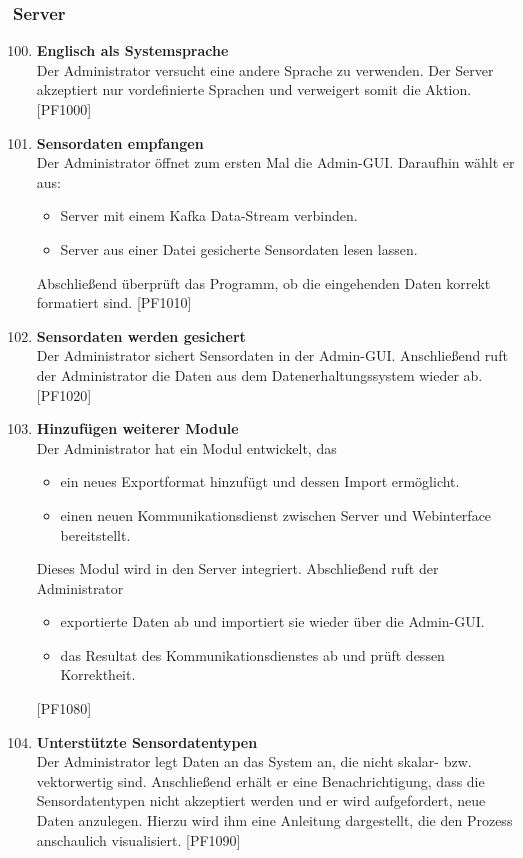 \subsubsection{Server}
\begin{enumerate}[label=\textbf{TK\arabic{enumi}0}]
	\setcounter{enumi}{99}
	
	\item \textbf{Englisch als Systemsprache}\\
	Der Administrator versucht eine andere Sprache zu verwenden. Der Server akzeptiert nur vordefinierte Sprachen und verweigert somit die Aktion. [PF1000]
	
	\item \textbf{Sensordaten empfangen}\\
	Der Administrator öffnet zum ersten Mal die Admin-GUI. Daraufhin wählt er aus:
	\begin{itemize}
		\item Server mit einem Kafka Data-Stream verbinden.
		\item Server aus einer Datei gesicherte Sensordaten lesen lassen.
	\end{itemize}
	Abschließend überprüft das Programm, ob die eingehenden Daten korrekt formatiert sind. [PF1010]
	
	\item \textbf{Sensordaten werden gesichert}\\
	Der Administrator sichert Sensordaten in der Admin-GUI. Anschließend ruft der Administrator die Daten aus dem Datenerhaltungssystem wieder ab. [PF1020]
	
	\item \textbf{Hinzufügen weiterer Module}\\
	Der Administrator hat ein Modul entwickelt, das
	\begin{itemize}
		\item ein neues Exportformat hinzufügt und dessen Import ermöglicht.
		\item einen neuen Kommunikationsdienst zwischen Server und Webinterface bereitstellt.
	\end{itemize}
	Dieses Modul wird in den Server integriert. Abschließend ruft der Administrator
	\begin{itemize}
		\item exportierte Daten ab und importiert sie wieder über die Admin-GUI.
		\item das Resultat des Kommunikationsdienstes ab und prüft dessen Korrektheit.
	\end{itemize}
	[PF1080]
	
	\item \textbf{Unterstützte Sensordatentypen}\\
	Der Administrator legt Daten an das System an, die nicht skalar- bzw. vektorwertig sind. Anschließend erhält er eine Benachrichtigung, dass die Sensordatentypen nicht akzeptiert werden und er wird aufgefordert, neue Daten anzulegen. Hierzu wird ihm eine Anleitung dargestellt, die den Prozess anschaulich visualisiert. [PF1090]
	
\end{enumerate}

